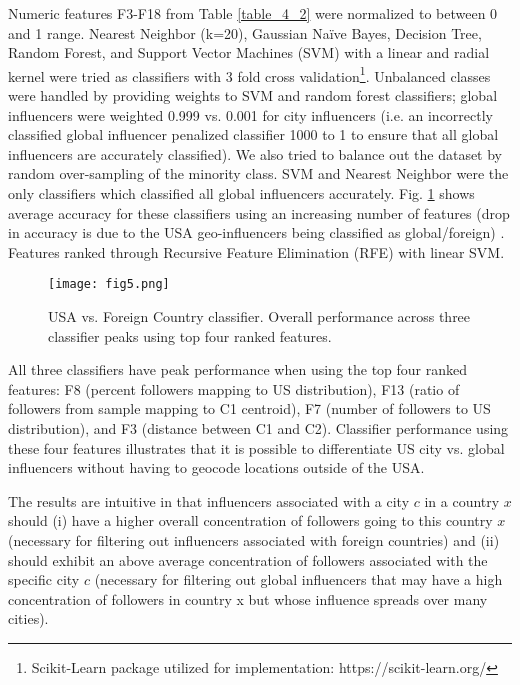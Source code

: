Numeric features F3-F18 from Table \ref{table_4_2} were normalized to between 0 and 1 range. Nearest Neighbor (k=20), Gaussian Naïve Bayes, Decision Tree, Random Forest, and Support Vector Machines (SVM) with a linear and radial kernel were tried as classifiers with 3 fold cross validation\footnote{Scikit-Learn package utilized for implementation: https://scikit-learn.org/}. Unbalanced classes were handled by providing weights to SVM and random forest classifiers; global influencers were weighted 0.999 vs. 0.001 for city influencers (i.e. an incorrectly classified global influencer penalized classifier 1000 to 1 to ensure that all global influencers are accurately classified). We also tried to balance out the dataset by random over-sampling of the minority class. SVM and Nearest Neighbor were the only classifiers which classified all global influencers accurately. Fig. \ref{fig_ch4_5} shows average accuracy for these classifiers using an increasing number of features (drop in accuracy is due to the USA geo-influencers being classified as global/foreign) . Features ranked through Recursive Feature Elimination (RFE) with linear SVM.

\begin{figure}[htbp]
\centerline{\texttt{[image: fig5.png]}}
\caption[USA vs. Foreign Country Classifier]{USA vs. Foreign Country classifier. Overall performance across three classifier peaks using top four ranked features.}
\label{fig_ch4_5}
\end{figure}

All three classifiers have peak performance when using the top four ranked features: F8 (percent followers mapping to US distribution), F13 (ratio of followers from sample mapping to C1 centroid), F7 (number of followers to US distribution), and F3 (distance between C1 and C2). Classifier performance using these four features illustrates that it is possible to differentiate US city vs. global influencers without having to geocode locations outside of the USA.

The results are intuitive in that influencers associated with a city $c$ in a country $x$ should (i) have a higher overall concentration of followers going to this country $x$ (necessary for filtering out influencers associated with foreign countries) and (ii) should exhibit an above average concentration of followers associated with the specific city $c$ (necessary for filtering out global influencers that may have a high concentration of followers in country x but whose influence spreads over many cities).

